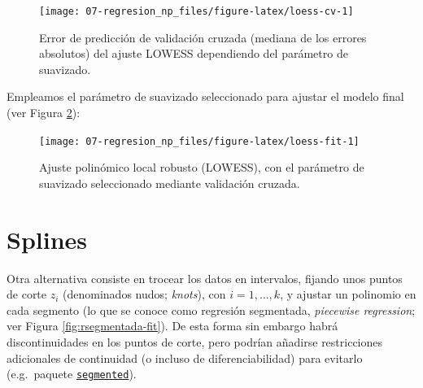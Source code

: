 \documentclass[
]{book}
\newenvironment{Shaded}{\begin{snugshade}}{\end{snugshade}}
\newcommand{\AttributeTok}[1]{\textcolor[rgb]{0.77,0.63,0.00}{#1}}
\newcommand{\CommentTok}[1]{\textcolor[rgb]{0.56,0.35,0.01}{\textit{#1}}}
\newcommand{\FunctionTok}[1]{\textcolor[rgb]{0.00,0.00,0.00}{#1}}
\newcommand{\NormalTok}[1]{#1}
\newcommand{\OtherTok}[1]{\textcolor[rgb]{0.56,0.35,0.01}{#1}}
\newcommand{\SpecialCharTok}[1]{\textcolor[rgb]{0.00,0.00,0.00}{#1}}
\newcommand{\StringTok}[1]{\textcolor[rgb]{0.31,0.60,0.02}{#1}}
\theoremstyle{break}
\theoremstyle{nonumberplain}
\renewcommand{\CommentTok}[1]{\textcolor[rgb]{0.41,0.41,0.41}{\texttt{#1}}}
\begin{document}
\begin{figure}[!htb]

{\centering \texttt{[image: 07-regresion\_np\_files/figure-latex/loess-cv-1]} 

}

\caption{Error de predicción de validación cruzada (mediana de los errores absolutos) del ajuste LOWESS dependiendo del parámetro de suavizado.}\label{fig:loess-cv}
\end{figure}

Empleamos el parámetro de suavizado seleccionado para ajustar el modelo final (ver Figura \ref{fig:loess-fit}):

\begin{Shaded}
\end{Shaded}

\begin{figure}[!htb]

{\centering \texttt{[image: 07-regresion\_np\_files/figure-latex/loess-fit-1]} 

}

\caption{Ajuste polinómico local robusto (LOWESS), con el parámetro de suavizado seleccionado mediante validación cruzada.}\label{fig:loess-fit}
\end{figure}

\hypertarget{splines}{%
\section{Splines}\label{splines}}

Otra alternativa consiste en trocear los datos en intervalos, fijando unos puntos de corte \(z_i\) (denominados nudos; \emph{knots}), con \(i = 1, \ldots, k\), y ajustar un polinomio en cada segmento (lo que se conoce como regresión segmentada, \emph{piecewise regression}; ver Figura \ref{fig:rsegmentada-fit}).
De esta forma sin embargo habrá discontinuidades en los puntos de corte, pero podrían añadirse restricciones adicionales de continuidad (o incluso de diferenciabilidad) para evitarlo (e.g.~paquete \href{NA}{\texttt{segmented}}).
\end{document}
